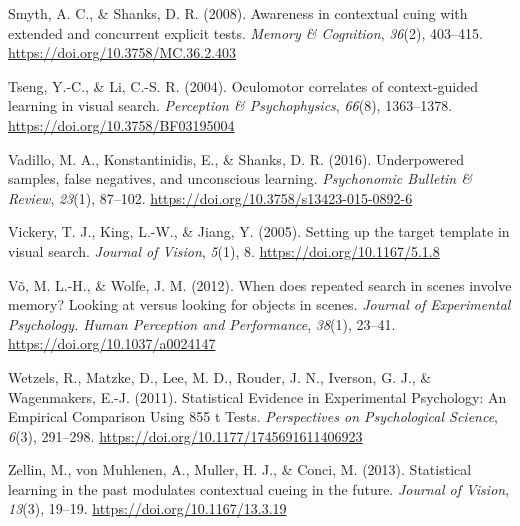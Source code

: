 \documentclass[
  man,floatsintext]{apa7}
\newlength{\cslhangindent}
\newlength{\cslentryspacingunit} %
\newenvironment{CSLReferences}[2] %
 {%
  \setlength{\parindent}{0pt}
  \ifodd #1
  \let\oldpar\par
  \def\par{\hangindent=\cslhangindent\oldpar}
  \fi
  \setlength{\parskip}{#2\cslentryspacingunit}
 }%
 {}
\begin{document}
\begin{CSLReferences}{1}{0}
\leavevmode{}%
Smyth, A. C., \& Shanks, D. R. (2008). Awareness in contextual cuing with extended and concurrent explicit tests. \emph{Memory \& Cognition}, \emph{36}(2), 403--415. \url{https://doi.org/10.3758/MC.36.2.403}

\leavevmode{}%
Tseng, Y.-C., \& Li, C.-S. R. (2004). Oculomotor correlates of context-guided learning in visual search. \emph{Perception \& Psychophysics}, \emph{66}(8), 1363--1378. \url{https://doi.org/10.3758/BF03195004}

\leavevmode{}%
Vadillo, M. A., Konstantinidis, E., \& Shanks, D. R. (2016). Underpowered samples, false negatives, and unconscious learning. \emph{Psychonomic Bulletin \& Review}, \emph{23}(1), 87--102. \url{https://doi.org/10.3758/s13423-015-0892-6}

\leavevmode{}%
Vickery, T. J., King, L.-W., \& Jiang, Y. (2005). Setting up the target template in visual search. \emph{Journal of Vision}, \emph{5}(1), 8. \url{https://doi.org/10.1167/5.1.8}

\leavevmode{}%
Võ, M. L.-H., \& Wolfe, J. M. (2012). When does repeated search in scenes involve memory? {Looking} at versus looking for objects in scenes. \emph{Journal of Experimental Psychology. Human Perception and Performance}, \emph{38}(1), 23--41. \url{https://doi.org/10.1037/a0024147}

\leavevmode{}%
Wetzels, R., Matzke, D., Lee, M. D., Rouder, J. N., Iverson, G. J., \& Wagenmakers, E.-J. (2011). Statistical {Evidence} in {Experimental Psychology}: {An Empirical Comparison Using} 855 t {Tests}. \emph{Perspectives on Psychological Science}, \emph{6}(3), 291--298. \url{https://doi.org/10.1177/1745691611406923}

\leavevmode{}%
Zellin, M., von Muhlenen, A., Muller, H. J., \& Conci, M. (2013). Statistical learning in the past modulates contextual cueing in the future. \emph{Journal of Vision}, \emph{13}(3), 19--19. \url{https://doi.org/10.1167/13.3.19}

\end{CSLReferences}
\end{document}
